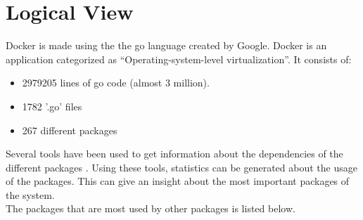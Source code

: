 
\section{Logical View}
\label{sec:viewlogical}


Docker is made using the the go language created by Google. Docker is an application categorized as ``Operating-system-level virtualization''. It consists of:
\begin{itemize}
\item 2979205 lines of go code (almost 3 million).
\item 1782 '.go' files
\item 267 different packages
\end{itemize}

Several tools have been used to get information about the dependencies of the different packages \cite{goviz} \cite{godepgraph}. Using these tools, statistics can be generated about the usage of the packages. This can give an insight about the most important packages of the system.\\
The packages that are most used by other packages is listed below.

